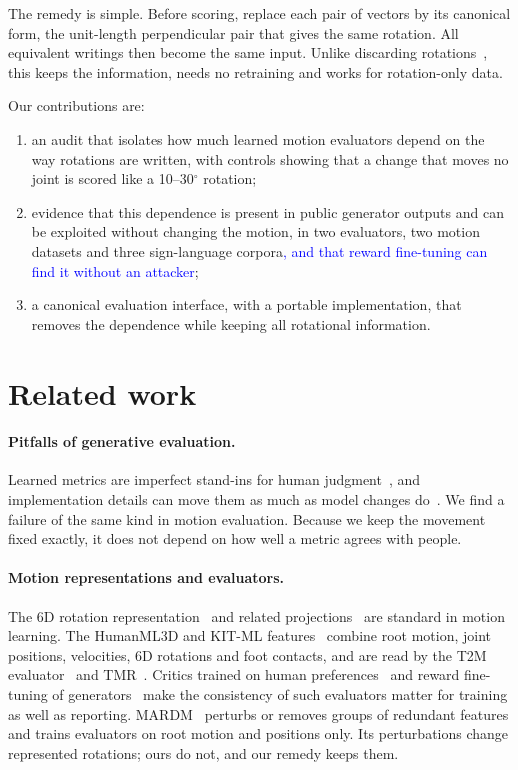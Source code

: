 \documentclass[10pt,twocolumn,letterpaper]{article}
\newcommand{\new}[1]{\textcolor{blue}{#1}}%
\begin{document}
The remedy is simple. Before scoring, replace each pair of vectors by its canonical form, the unit-length perpendicular pair that gives the same rotation. All equivalent writings then become the same input. Unlike discarding rotations~\cite{mardm2025}, this keeps the information, needs no retraining and works for rotation-only data.

\noindent Our contributions are:
\begin{enumerate}
\item an audit that isolates how much learned motion evaluators depend on the way rotations are written, with controls showing that a change that moves no joint is scored like a 10--30$^\circ$ rotation;
\item evidence that this dependence is present in public generator outputs and can be exploited without changing the motion, in two evaluators, two motion datasets and three sign-language corpora\new{, and that reward fine-tuning can find it without an attacker};
\item a canonical evaluation interface, with a portable implementation, that removes the dependence while keeping all rotational information.
\end{enumerate}

\section{Related work}
\paragraph{Pitfalls of generative evaluation.}
Learned metrics are imperfect stand-ins for human judgment~\cite{jayasumana2024,stein2023,voas2023}, and implementation details can move them as much as model changes do~\cite{parmar2022,kynkaanniemi2023}. We find a failure of the same kind in motion evaluation. Because we keep the movement fixed exactly, it does not depend on how well a metric agrees with people.

\paragraph{Motion representations and evaluators.}
The 6D rotation representation~\cite{zhou2019} and related projections~\cite{levinson2020} are standard in motion learning. The HumanML3D and KIT-ML features~\cite{guo2022,kit2016} combine root motion, joint positions, velocities, 6D rotations and foot contacts, and are read by the T2M evaluator~\cite{guo2022} and TMR~\cite{tmr2023}. Critics trained on human preferences~\cite{wang2025motioncritic} and reward fine-tuning of generators~\cite{draft2024,tan2026,motionrft2026} make the consistency of such evaluators matter for training as well as reporting. MARDM~\cite{mardm2025} perturbs or removes groups of redundant features and trains evaluators on root motion and positions only. Its perturbations change represented rotations; ours do not, and our remedy keeps them.
\end{document}
